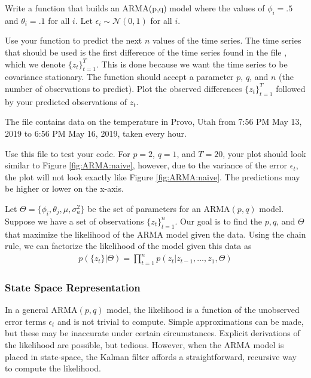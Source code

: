 \begin{problem}
Write a function  that builds an ARMA(p,q) model where the values of $\phi_i=.5$ and $\theta_i=.1$ for all $i$.
Let $\epsilon_i\sim\mathscr{N}(0,1)$ for all $i$.

Use your function to predict the next $n$ values of the time series. 
The time series that should be used is the first difference of the time series found in the file , which we denote $\{z_t\}_{t=1}^T$.
This is done because we want the time series to be covariance stationary.
The function should accept a parameter $p$, $q$, and $n$ (the number of observations to predict).
Plot the observed differences $\{z_t\}_{t=1}^T$ followed by your predicted observations of $z_t$.

The file  contains data on the temperature in Provo, Utah from 7:56 PM May 13, 2019 to 6:56 PM May 16, 2019, taken every hour.

Use this file to test your code.
For $p=2$, $q=1$, and $T=20$, your plot should look similar to Figure \ref{fig:ARMA:naive}, however, due to the variance of the error $\epsilon_t$, the plot will not look exactly like Figure \ref{fig:ARMA:naive}.
The predictions may be higher or lower on the x-axis.
\label{prob:arma:naive}
\end{problem}

Let $\Theta = \{\phi_i, \theta_j, \mu, \sigma_a^2\}$ be the set of parameters
for an $\text{ARMA}(p,q)$ model.
Suppose we have a set of observations $\{z_t\}_{t=1}^n$.
Our goal is to find the $p,q$, and $\Theta$ that maximize the likelihood of the ARMA model given the data.
Using the chain rule, we can factorize the likelihood of the model given this data as
\begin{align}
    \label{eq:arma:factorized}
    p(\{z_t\} | \Theta) = \prod_{t=1}^{n} p(z_t | z_{t-1}, \ldots, z_{1},
    \Theta)
\end{align}

\subsubsection*{State Space Representation}

In a general $\text{ARMA}(p,q)$ model, the likelihood is a function of the
unobserved error terms $\epsilon_t$ and is not trivial to compute.
Simple approximations can be made, but these may be inaccurate under certain
circumstances.
Explicit derivations of the likelihood are possible, but
tedious.
However, when the $\text{ARMA}$ model is placed in state-space, the
Kalman filter affords a straightforward, recursive way to compute the
likelihood.

